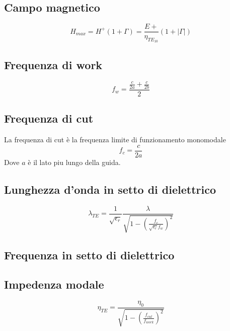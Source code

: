 \documentclass[10pt,a4paper]{report}
\begin{document}
		\subsection{Campo magnetico}

				\begin{equation}
				H_{max}=H^+(1+\Gamma)=\frac{E+}{\eta_{TE_{10}}}{(1+|\Gamma|)}
				\end{equation}

		\subsection{Frequenza di work}

				\begin{equation}
				f_w=\frac{\frac{c}{2a}+\frac{c}{2b}}{2}
				\end{equation}

		\subsection{Frequenza di cut}
	
				La frequenza di cut è la frequenza limite di funzionamento monomodale
				\begin{equation}
				f_c=\frac{c}{2a}
				\end{equation}
				Dove $a$ è il lato piu lungo della guida.

		\subsection{Lunghezza d'onda in setto di dielettrico}

			\begin{equation}
			\lambda_{TE}=\frac{1}{\sqrt{\epsilon_r}}\frac{\lambda}{\sqrt{1- (\frac{f_c}{\sqrt{\epsilon_r}f_w})^2}}
			\end{equation}
			

		\subsection{Frequenza in setto di dielettrico}




		\subsection{Impedenza modale}

				\begin{equation}
				\eta_{TE}=\frac{\eta_0}{ \sqrt{ 1- ( \frac {f_{cut}} {f_{work}} )^2 } }
				\end{equation}
\end{document}
